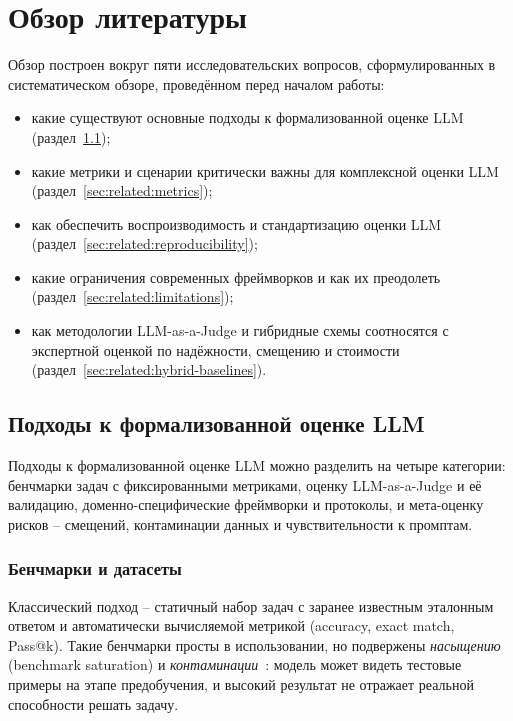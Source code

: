 \chapter{Обзор литературы}
\label{sec:related}

Обзор построен вокруг пяти исследовательских вопросов, сформулированных
в систематическом обзоре, проведённом перед началом работы:

\begin{itemize}
    \item[RQ1] какие существуют основные подходы к формализованной
        оценке LLM (раздел~\ref{sec:related:approaches});
    \item[RQ2] какие метрики и сценарии критически важны для комплексной
        оценки LLM (раздел~\ref{sec:related:metrics});
    \item[RQ3] как обеспечить воспроизводимость и стандартизацию оценки
        LLM (раздел~\ref{sec:related:reproducibility});
    \item[RQ4] какие ограничения современных фреймворков и как их
        преодолеть (раздел~\ref{sec:related:limitations});
    \item[RQ5] как методологии LLM-as-a-Judge и гибридные схемы
        соотносятся с экспертной оценкой по надёжности, смещению и
        стоимости (раздел~\ref{sec:related:hybrid-baselines}).
\end{itemize}

\section{Подходы к формализованной оценке LLM}
\label{sec:related:approaches}

Подходы к формализованной оценке LLM можно разделить на четыре
категории: бенчмарки задач с фиксированными метриками, оценку
LLM-as-a-Judge и её валидацию, доменно-специфические фреймворки и
протоколы, и мета-оценку рисков -- смещений, контаминации данных и
чувствительности к промптам.

\subsection{Бенчмарки и датасеты}

Классический подход -- статичный набор задач с заранее известным
эталонным ответом и автоматически вычисляемой метрикой (accuracy,
exact match, Pass@k).
Такие бенчмарки просты в использовании, но подвержены
\emph{насыщению} (benchmark saturation) и
\emph{контаминации}~\cite{sainz2023nlpevaluation}: модель может видеть
тестовые примеры на этапе предобучения, и высокий результат не
отражает реальной способности решать задачу.

